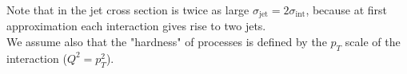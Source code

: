 Note that in  the jet cross section is twice as large $\sigma_{\text{jet}}=2\sigma_{\text{int}}$, because at first approximation each interaction gives rise to two jets.
\\
We assume also that the "hardness" of processes is defined by the $p_T$ scale of the interaction ($Q^2=p_T^2$).


